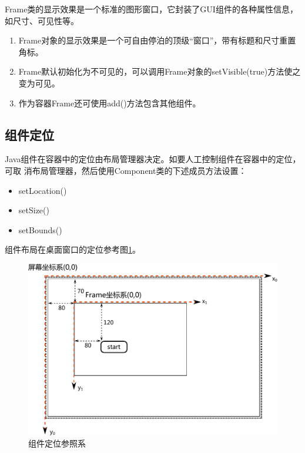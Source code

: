 Frame类的显示效果是一个标准的图形窗口，它封装了GUI组件的各种属性信息，如尺寸、可见性等。

\begin{enumerate}\kai
\item Frame对象的显示效果是一个可自由停泊的顶级“窗口”，带有标题和尺寸重置角标。
\item Frame默认初始化为不可见的，可以调用Frame对象的setVisible(true)方法使之变为可见。
\item 作为容器Frame还可使用add()方法包含其他组件。
\end{enumerate}


\subsection{组件定位}

Java组件在容器中的定位由{\hei 布局管理器}决定。如要人工控制组件在容器中的定位，可取
消布局管理器，然后使用Component类的下述成员方法设置：

\begin{itemize}
\item setLocation()
\item setSize()
\item setBounds()
\end{itemize}

组件布局在桌面窗口的定位参考图\ref{fig:fig-AWT-components-location}。

\begin{figure}[htb]
\centering
\includegraphics[width=\textwidth]{images/Java-GUI-programming/fig-AWT-components-location.pdf}
\caption{组件定位参照系}
\label{fig:fig-AWT-components-location}
\end{figure}

